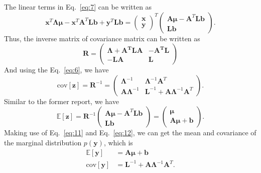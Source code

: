 \documentclass{article}
\begin{document}
    The linear terms in Eq.~{\ref{eq:7}} can be written as
    \begin{equation}
    \mathbf{x}^T\boldsymbol{\Lambda\mu}-\mathbf{x}^T\mathbf{A}^T\mathbf{Lb}+\mathbf{y}^T\mathbf{Lb}=\left(\begin{array}{c}
    \mathbf{x}\\
    \mathbf{y}\end{array}\right)^T\left(\begin{array}{c}
    \mathbf{A}\boldsymbol{\mu}-\mathbf{A}^T\mathbf{Lb}\\
    \mathbf{Lb}\end{array}\right).
    \end{equation}
    Thus, the inverse matrix of covariance matrix can be written as
    \begin{equation}
    \mathbf{R} = \left(\begin{array}{cc}
    \boldsymbol{\Lambda}+\mathbf{A^TLA} & -\mathbf{A^TL}\\
    -\mathbf{LA} & \mathbf{L}\end{array}\right)
    \end{equation}
    And using the Eq.~{\ref{eq:6}}, we have
    \begin{equation}
    \text{cov}[\mathbf{z}]=\mathbf{R}^{-1}=\left(\begin{array}{cc}
    \boldsymbol{\Lambda}^{-1} & \boldsymbol{\Lambda}^{-1}\mathbf{A}^{T}\\
    \mathbf{A}\boldsymbol{\Lambda}^{-1} & \mathbf{L}^{-1}+\mathbf{A}\boldsymbol{\Lambda}^{-1}\mathbf{A}^{T}\end{array}\right).\label{eq:11}
    \end{equation}
    Similar to the former report, we have
    \begin{equation}
	\mathds{E}[\mathbf{z}] = \mathbf{R}^{-1}\left(\begin{array}{c}
	\mathbf{A}\boldsymbol{\mu}-\mathbf{A}^T\mathbf{Lb}\\
	\mathbf{Lb}\end{array}\right) = \left(\begin{array}{c}
	\boldsymbol{\mu}\\
	\mathbf{A}\boldsymbol{\mu}+\mathbf{b}\end{array}\right).\label{eq:12}
    \end{equation}
    Making use of Eq.~{\ref{eq:11}} and Eq.~{\ref{eq:12}}, we can get the mean and covariance of the marginal distribution $p(\mathbf{y})$, which is
    \begin{align}
   	\mathds{E}[\mathbf{y}] &= \mathbf{A}\boldsymbol{\mu}+\mathbf{b}\\
   	\text{cov}[\mathbf{y}] &= \mathbf{L}^{-1} + \mathbf{A}\boldsymbol{\Lambda}^{-1}\mathbf{A}^{T}. 
    \end{align}
\end{document}
